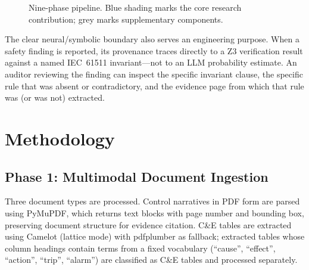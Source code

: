 \documentclass[conference]{IEEEtran}
\begin{document}
\begin{figure}[t]
\centering
{}
\caption{Nine-phase pipeline. Blue shading marks the core research
contribution; grey marks supplementary components.}
\label{fig:architecture}
\end{figure}

The clear neural/symbolic boundary also serves an engineering purpose.
When a safety finding is reported, its provenance traces directly to a Z3
verification result against a named IEC~61511 invariant---not to an
LLM probability estimate. An auditor reviewing the finding can inspect
the specific invariant clause, the specific rule that was absent or
contradictory, and the evidence page from which that rule was (or was
not) extracted.

\section{Methodology}

\subsection{Phase 1: Multimodal Document Ingestion}
Three document types are processed. Control narratives in PDF form are
parsed using PyMuPDF, which returns text blocks with page number and
bounding box, preserving document structure for evidence citation.
C\&E tables are extracted using Camelot (lattice mode) with pdfplumber
as fallback; extracted tables whose column headings contain terms from
a fixed vocabulary (``cause'', ``effect'', ``action'', ``trip'',
``alarm'') are classified as C\&E tables and processed separately.
\end{document}
